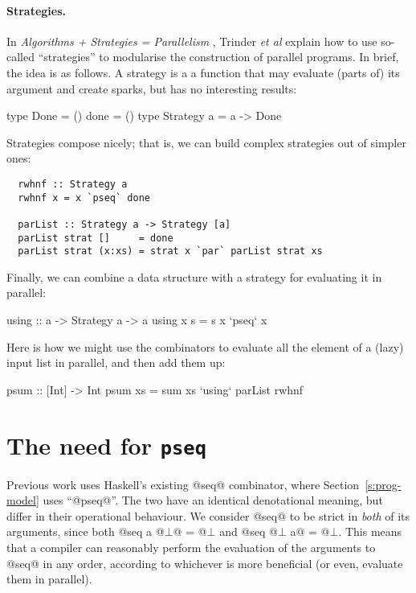 \documentclass[twocolumn,9pt]{sigplanconf}
\begin{document}
\paragraph{Strategies.}
In \emph{Algorithms + Strategies = Parallelism} \cite{trinder:strategies},
Trinder \emph{et al} explain how to use so-called ``strategies'' to modularise
the construction of parallel programs.  In brief, the idea is as follows.
A strategy is a a function that may evaluate (parts of) its argument
and create sparks, but has no interesting results:
\par{\small
\begin{code}
  type Done = ()
  done = ()
  type Strategy a = a -> Done
\end{code}
}
Strategies compose nicely; that is, we can build complex strategies out of simpler ones:
\par{\small
\begin{verbatim}
  rwhnf :: Strategy a
  rwhnf x = x `pseq` done

  parList :: Strategy a -> Strategy [a]
  parList strat []     = done
  parList strat (x:xs) = strat x `par` parList strat xs
\end{verbatim}
}
Finally, we can combine a data structure with a strategy for evaluating it in 
parallel:
\par{\small
\begin{code}
  using :: a -> Strategy a -> a 
  using x s = s x `pseq` x
\end{code}
}
Here is how we might use the combinators to evaluate all the element of a (lazy) 
input list in parallel, and then add them up:
\par{\small
\begin{code}
  psum :: [Int] -> Int
  psum xs = sum xs `using` parList rwhnf
\end{code}
}
\section{The need for \texttt{pseq}} \label{s:pseq}

Previous work \cite{trinder:strategies} uses Haskell's existing @seq@ combinator,
where Section~\ref{s:prog-model} uses ``@pseq@''.
The two have an identical denotational meaning, but differ in their
operational behaviour.  We consider @seq@ to be strict in \emph{both} of
its arguments, since both @seq a @$\bot$@ = @$\bot$ and @seq @$\bot$
a@ = @$\bot$.  This means that a compiler can reasonably perform the
evaluation of the arguments to @seq@ in any order, according to
whichever is more beneficial (or even, evaluate them in parallel).
\end{document}
